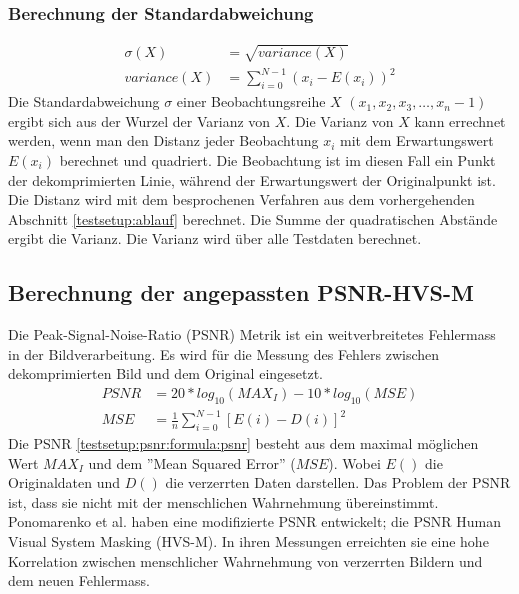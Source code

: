 \subsubsection{Berechnung der Standardabweichung}
\begin{equation} \label{testsetup:ablauf:formula:deviation}
	\begin{split}
		\sigma(X)& = \sqrt{variance(X)}\\
		variance(X) & = \sum_{i=0}^{N-1}{(x_i - E(x_i))^2}
	\end{split}
\end{equation}
Die Standardabweichung $\sigma$ einer Beobachtungsreihe $X$ $(x_1,x_2,x_3,\ldots, x_n-1)$ ergibt sich aus der Wurzel der Varianz von $X$. Die Varianz von $X$ kann errechnet werden, wenn man den Distanz jeder Beobachtung $x_i$ mit dem Erwartungswert $E(x_i)$ berechnet und quadriert. Die Beobachtung ist im diesen Fall ein Punkt der dekomprimierten Linie, während der Erwartungswert der Originalpunkt ist. Die Distanz wird mit dem besprochenen Verfahren aus dem vorhergehenden Abschnitt \ref{testsetup:ablauf} berechnet. Die Summe der quadratischen Abstände ergibt die Varianz. Die Varianz wird über alle Testdaten berechnet.

\subsection{Berechnung der angepassten PSNR-HVS-M}\label{testsetup:psnr}
Die Peak-Signal-Noise-Ratio (PSNR) Metrik ist ein weitverbreitetes Fehlermass in der Bildverarbeitung. Es wird für die Messung des Fehlers zwischen dekomprimierten Bild und dem Original eingesetzt. 
\begin{equation} \label{testsetup:psnr:formula:psnr}
\begin{split}
PSNR & = 20 * log_{10}(MAX_I) - 10*log_{10}(MSE) \\
MSE & = \frac{1}{n}\sum_{i=0}^{N-1}[E(i)-D(i)]^2
\end{split}
\end{equation}
Die PSNR \eqref{testsetup:psnr:formula:psnr} besteht aus dem maximal möglichen Wert $MAX_I$ und dem ''Mean Squared Error'' ($MSE$). Wobei $E()$ die Originaldaten und $D()$ die verzerrten Daten darstellen. Das Problem der PSNR ist, dass sie nicht mit der menschlichen Wahrnehmung übereinstimmt. Ponomarenko et al. \cite{ponomarenko2007between:psnr} haben eine modifizierte PSNR entwickelt; die PSNR Human Visual System Masking (HVS-M). In ihren Messungen erreichten sie eine hohe Korrelation zwischen menschlicher Wahrnehmung von verzerrten Bildern und dem neuen Fehlermass.

